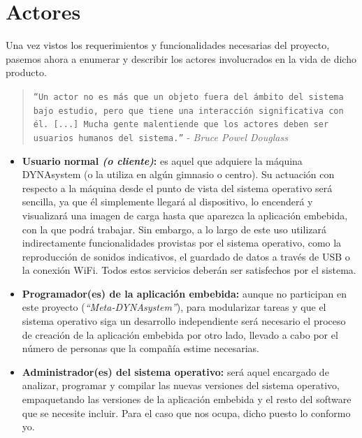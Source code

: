 \section{Actores}

Una vez vistos los requerimientos y funcionalidades necesarias del proyecto, pasemos ahora a enumerar y describir los actores involucrados en la vida de dicho producto.

\begin{quotation}
	\texttt{``Un actor no es más que un objeto fuera del ámbito del sistema bajo estudio, pero que tiene una interacción significativa con él. [...] Mucha gente malentiende que los actores deben ser usuarios humanos del sistema.''} - \textit{Bruce Powel Douglass} \cite{real-time-uml-use-cases}
\end{quotation}

\begin{itemize}
	\item \textbf{Usuario normal \textit{(o cliente)}:} es aquel que adquiere la máquina DYNAsystem (o la utiliza en algún gimnasio o centro). Su actuación con respecto a la máquina desde el punto de vista del sistema operativo será sencilla, ya que él simplemente llegará al dispositivo, lo encenderá y visualizará una imagen de carga hasta que aparezca la aplicación embebida, con la que podrá trabajar. Sin embargo, a lo largo de este uso utilizará indirectamente funcionalidades provistas por el sistema operativo, como la reproducción de sonidos indicativos, el guardado de datos a través de USB o la conexión WiFi. Todos estos servicios deberán ser satisfechos por el sistema.
	\item \textbf{Programador(es) de la aplicación embebida:} aunque no participan en este proyecto (\textit{``Meta-DYNAsystem''}), para modularizar tareas y que el sistema operativo siga un desarrollo independiente será necesario el proceso de creación de la aplicación embebida por otro lado, llevado a cabo por el número de personas que la compañía estime necesarias.
	\item \textbf{Administrador(es) del sistema operativo:} será aquel encargado de analizar, programar y compilar las nuevas versiones del sistema operativo, empaquetando las versiones de la aplicación embebida y el resto del software que se necesite incluir. Para el caso que nos ocupa, dicho puesto lo conformo yo.
\end{itemize}

\newpage
